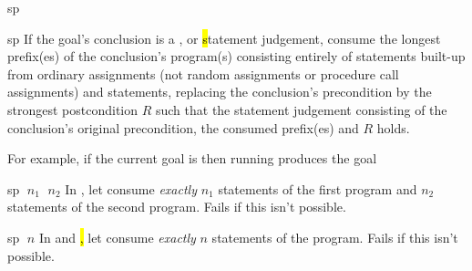 \begin{tactic}{sp}
  \begin{tsyntax}{sp}
    If the goal's conclusion is a \prhl, \phl or \hl statement
    judgement, consume the longest prefix(es) of the conclusion's
    program(s) consisting entirely of statements built-up from
    ordinary assignments (not random assignments or procedure call
    assignments) and  statements, replacing the conclusion's
    precondition by the strongest postcondition $R$ such that the
    statement judgement consisting of the conclusion's original
    precondition, the consumed prefix(es) and $R$
    holds.

    \bigskip For example, if the current goal is
     then
    running 
    produces the goal
  \end{tsyntax}

  \begin{tsyntax}{sp $\;n_1$ $\;n_2$}
    In \prhl, let  consume \emph{exactly} $n_1$ statements of
    the first program and $n_2$ statements of the second
    program. Fails if this isn't possible.
  \end{tsyntax}

  \begin{tsyntax}{sp $\;n$}
    In \phl and \hl, let  consume \emph{exactly} $n$ statements
    of the program. Fails if this isn't possible.
  \end{tsyntax}
\end{tactic}
